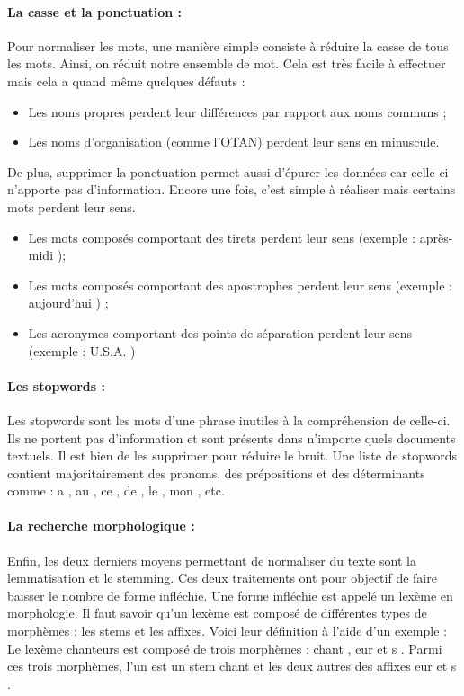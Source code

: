                 \paragraph{La casse et la ponctuation :}
                    Pour normaliser les mots, une manière simple consiste à réduire la casse de tous les mots. Ainsi, on réduit notre ensemble de mot. Cela est très facile à effectuer mais cela a quand même quelques défauts :
                    \begin{itemize}
                        \item Les noms propres perdent leur différences par rapport aux noms communs ;
                        \item Les noms d'organisation (comme l'OTAN) perdent leur sens en minuscule.
                    \end{itemize}
                    De plus, supprimer la ponctuation permet aussi d'épurer les données car celle-ci n'apporte pas d'information. Encore une fois, c'est simple à réaliser mais certains mots perdent leur sens.
                    \begin{itemize}
                        \item Les mots composés comportant des tirets perdent leur sens (exemple : \og après-midi \fg);
                        \item Les mots composés comportant des apostrophes perdent leur sens (exemple : \og aujourd'hui \fg) ;
                        \item Les acronymes comportant des points de séparation perdent leur sens (exemple : \og U.S.A. \fg)
                    \end{itemize}

                \paragraph{Les stopwords :}
                    Les stopwords sont les mots d'une phrase inutiles à la compréhension de celle-ci. Ils ne portent pas d'information et sont présents dans n'importe quels documents textuels. Il est bien de les supprimer pour réduire le bruit. Une liste de stopwords contient majoritairement des pronoms, des prépositions et des déterminants comme : \og a \fg, \og au \fg, \og ce \fg, \og de \fg, \og le \fg, \og mon \fg, etc.

                \paragraph{La recherche morphologique :}
                    Enfin, les deux derniers moyens permettant de normaliser du texte sont la lemmatisation et le stemming. Ces deux traitements ont pour objectif de faire baisser le nombre de forme infléchie. Une forme infléchie est appelé un lexème en morphologie. Il faut savoir qu'un lexème est composé de différentes types de morphèmes : les stems et les affixes. Voici leur définition à l'aide d'un exemple :\\
                    Le lexème \og chanteurs \fg est composé de trois morphèmes : \og chant \fg, \og eur \fg et \og s \fg. Parmi ces trois morphèmes, l'un est un stem \og chant \fg et les deux autres des affixes \og eur \fg et \og s \fg.


